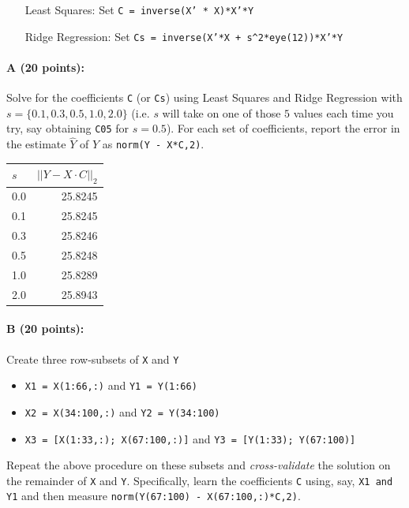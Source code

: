 \documentclass[11pt]{article}
\begin{document}
\begin{itemize} \denselist
\item[\textsf{Least Squares:} ]  Set \texttt{C = inverse(X' * X)*X'*Y}
\item[\textsf{Ridge Regression:} ] Set \texttt{Cs = inverse(X'*X + s\^{}2*eye(12))*X'*Y}
\end{itemize}

\paragraph{A (20 points): }
Solve for the coefficients \texttt{C} (or \texttt{Cs}) using Least Squares and Ridge Regression with $s = \{0.1, 0.3, 0.5, 1.0, 2.0\}$ (i.e. $s$ will take on one of those $5$ values each time you try, say obtaining \texttt{C05} for $s=0.5$).  
For each set of coefficients, report the error in the estimate $\hat{Y}$ of $Y$ as 
\texttt{norm(Y - X*C,2)}.

\begin{table}[H]
\centering
\begin{tabular}{@{}l r@{}}
\hline\hline
$s$ & $\left|\left| Y - X\cdot C\right|\right|_{2}$\\
\hline
0.0 & 25.8245 \\
0.1 & 25.8245 \\
0.3 & 25.8246 \\
0.5 & 25.8248 \\
1.0 & 25.8289 \\
2.0 & 25.8943 \\
\hline
\end{tabular}
\end{table}


\paragraph{B (20 points): }
Create three row-subsets of \texttt{X} and \texttt{Y}
\begin{itemize} \denselist
\item \texttt{X1 = X(1:66,:)} and \texttt{Y1 = Y(1:66)}
\item \texttt{X2 = X(34:100,:)} and \texttt{Y2 = Y(34:100)}
\item \texttt{X3 = [X(1:33,:); X(67:100,:)]} and \texttt{Y3 = [Y(1:33); Y(67:100)]}
\end{itemize}

Repeat the above procedure on these subsets and \emph{cross-validate} the solution on the remainder of \texttt{X} and \texttt{Y}.  Specifically, learn the coefficients \texttt{C} using, say, \texttt{X1 and Y1} and then measure \texttt{norm(Y(67:100) - X(67:100,:)*C,2)}.  
\end{document}
